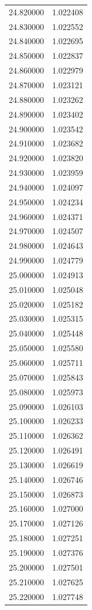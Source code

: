 \begin{tabular}{rr}
24.820000 & 1.022408 \\
24.830000 & 1.022552 \\
24.840000 & 1.022695 \\
24.850000 & 1.022837 \\
24.860000 & 1.022979 \\
24.870000 & 1.023121 \\
24.880000 & 1.023262 \\
24.890000 & 1.023402 \\
24.900000 & 1.023542 \\
24.910000 & 1.023682 \\
24.920000 & 1.023820 \\
24.930000 & 1.023959 \\
24.940000 & 1.024097 \\
24.950000 & 1.024234 \\
24.960000 & 1.024371 \\
24.970000 & 1.024507 \\
24.980000 & 1.024643 \\
24.990000 & 1.024779 \\
25.000000 & 1.024913 \\
25.010000 & 1.025048 \\
25.020000 & 1.025182 \\
25.030000 & 1.025315 \\
25.040000 & 1.025448 \\
25.050000 & 1.025580 \\
25.060000 & 1.025711 \\
25.070000 & 1.025843 \\
25.080000 & 1.025973 \\
25.090000 & 1.026103 \\
25.100000 & 1.026233 \\
25.110000 & 1.026362 \\
25.120000 & 1.026491 \\
25.130000 & 1.026619 \\
25.140000 & 1.026746 \\
25.150000 & 1.026873 \\
25.160000 & 1.027000 \\
25.170000 & 1.027126 \\
25.180000 & 1.027251 \\
25.190000 & 1.027376 \\
25.200000 & 1.027501 \\
25.210000 & 1.027625 \\
25.220000 & 1.027748 \\

\end{tabular}

